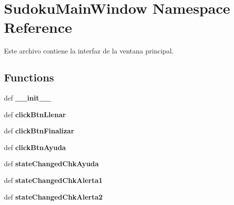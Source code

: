 \hypertarget{namespace_sudoku_main_window}{\section{Sudoku\-Main\-Window Namespace Reference}
\label{namespace_sudoku_main_window}
}


Este archivo contiene la interfaz de la ventana principal.  


\subsection*{Functions}
\begin{DoxyCompactItemize}
\item 
\hypertarget{namespace_sudoku_main_window_ad2dce6a936d7220c129c340af891ecf5}{def {\bfseries \-\_\-\-\_\-init\-\_\-\-\_\-}}\label{namespace_sudoku_main_window_ad2dce6a936d7220c129c340af891ecf5}

\item 
\hypertarget{namespace_sudoku_main_window_a3e89ea56838c070f5a743f0dc9b48168}{def {\bfseries click\-Btn\-Llenar}}\label{namespace_sudoku_main_window_a3e89ea56838c070f5a743f0dc9b48168}

\item 
\hypertarget{namespace_sudoku_main_window_aa8553daab0286fd6ed1472e6336abc35}{def {\bfseries click\-Btn\-Finalizar}}\label{namespace_sudoku_main_window_aa8553daab0286fd6ed1472e6336abc35}

\item 
\hypertarget{namespace_sudoku_main_window_a239c965f01439feb5ba906bfd20e0fb2}{def {\bfseries click\-Btn\-Ayuda}}\label{namespace_sudoku_main_window_a239c965f01439feb5ba906bfd20e0fb2}

\item 
\hypertarget{namespace_sudoku_main_window_a0b895acd7ac313c3baed7db1c47d3df9}{def {\bfseries state\-Changed\-Chk\-Ayuda}}\label{namespace_sudoku_main_window_a0b895acd7ac313c3baed7db1c47d3df9}

\item 
\hypertarget{namespace_sudoku_main_window_a09d1fff15ee91d88f8c1a730608cac66}{def {\bfseries state\-Changed\-Chk\-Alerta1}}\label{namespace_sudoku_main_window_a09d1fff15ee91d88f8c1a730608cac66}

\item 
\hypertarget{namespace_sudoku_main_window_a6c6afa026d67f130277504d88f9dac1f}{def {\bfseries state\-Changed\-Chk\-Alerta2}}\label{namespace_sudoku_main_window_a6c6afa026d67f130277504d88f9dac1f}


\end{DoxyCompactItemize}
